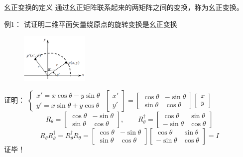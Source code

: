 \begin{frame} 
    \frametitle{}
    \begin{tcolorbox1}{幺正变换的定义}
    通过幺正矩阵联系起来的两矩阵之间的变换，称为幺正变换。
    \end{tcolorbox1}
    \alert{例1：} 试证明二维平面矢量绕原点的旋转变换是幺正变换
    \begin{figure} %
        \includegraphics[width=0.29\textwidth]{figs/transf1.png}   
    \end{figure}
    \alert{证明：}
    $\left\{\begin{matrix}
        x'=x\cos\theta -y\sin\theta\\
        y'=x\sin\theta+y\cos\theta
    \end{matrix}\right.$ \qquad
    $\begin{bmatrix}
        x' \\
        y'
    \end{bmatrix}
    =
    \begin{bmatrix}
        \cos\theta & -\sin\theta\\
        \sin\theta & \cos\theta
    \end{bmatrix}
    \begin{bmatrix}
        x \\
        y
    \end{bmatrix}$\\
    $$ R_\theta=
    \begin{bmatrix}
        \cos\theta &-\sin\theta\\
        \sin\theta &\cos\theta
    \end{bmatrix} ,\qquad
    R_\theta ^{\dagger}=
    \begin{bmatrix}
        \cos\theta &\sin\theta\\
        -\sin\theta &\cos\theta
    \end{bmatrix} $$
    $$ R_\theta  R_\theta ^{\dagger} = R_\theta ^{\dagger} R_\theta=  
    \begin{bmatrix}
        \cos\theta &-\sin\theta\\
        \sin\theta &\cos\theta
    \end{bmatrix}
    \begin{bmatrix}
        \cos\theta &\sin\theta\\
        -\sin\theta &\cos\theta
    \end{bmatrix}
    =I
    $$
    证毕！
\end{frame}

